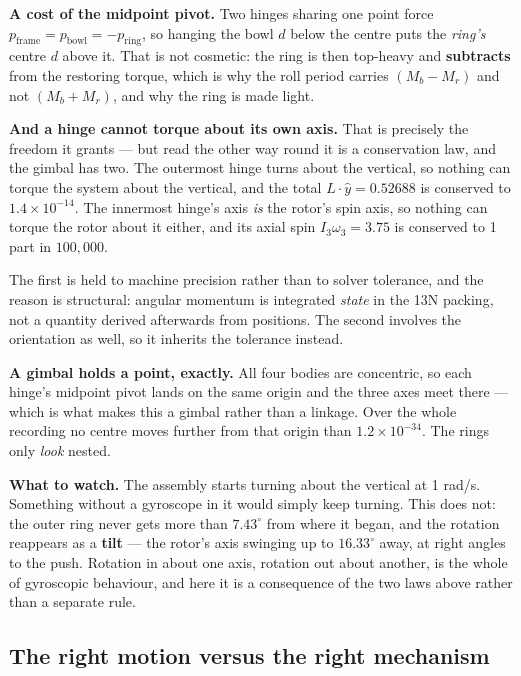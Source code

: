 \documentclass[11pt]{article}
\begin{document}
\textbf{A cost of the midpoint pivot.} Two hinges sharing one point
force $p_{\text{frame}} = p_{\text{bowl}} = -p_{\text{ring}}$, so
hanging the bowl $d$ below the centre puts the \emph{ring's} centre $d$
above it. That is not cosmetic: the ring is then top-heavy and
\textbf{subtracts} from the restoring torque, which is why the roll
period carries $(M_b - M_r)$ and not $(M_b + M_r)$, and why the ring is
made light.

\textbf{And a hinge cannot torque about its own axis.} That is
precisely the freedom it grants --- but read the other way round it is
a conservation law, and the gimbal has two. The outermost hinge turns
about the vertical, so nothing can torque the system about the
vertical, and the total $L\cdot\hat y = 0.52688$ is conserved to
$1.4\times10^{-14}$. The innermost hinge's axis \emph{is} the rotor's
spin axis, so nothing can torque the rotor about it either, and its
axial spin $I_3\omega_3 = 3.75$ is conserved to 1 part in $100{,}000$.

The first is held to machine precision rather than to solver tolerance,
and the reason is structural: angular momentum is integrated
\emph{state} in the 13N packing, not a quantity derived afterwards from
positions. The second involves the orientation as well, so it inherits
the tolerance instead.

\textbf{A gimbal holds a point, exactly.} All four bodies are
concentric, so each hinge's midpoint pivot lands on the same origin and
the three axes meet there --- which is what makes this a gimbal rather
than a linkage. Over the whole recording no centre moves further from
that origin than $1.2\times10^{-34}$. The rings only \emph{look} nested.

\textbf{What to watch.} The assembly starts turning about the vertical
at 1 rad/s. Something without a gyroscope in it would simply keep
turning. This does not: the outer ring never gets more than
$7.43^\circ$ from where it began, and the rotation reappears as a
\textbf{tilt} --- the rotor's axis swinging up to $16.33^\circ$ away, at
right angles to the push. Rotation in about one axis, rotation out
about another, is the whole of gyroscopic behaviour, and here it is a
consequence of the two laws above rather than a separate rule.

\subsection{The right motion versus the right mechanism}
\end{document}
